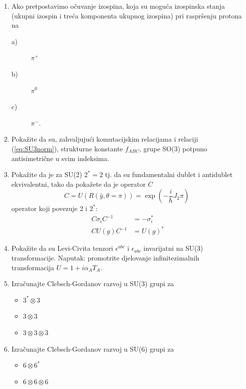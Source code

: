 \begin{enumerate}[label=\arabic{chapter}.\arabic*.]

\item Ako pretpostavimo očuvanje izospina, koja su moguća izospinska
stanja (ukupni izospin i treća komponenta ukupnog izospina) pri
raspršenju protona na

 \begin{description} \item[a)] $\pi^+$
                     \item[b)] $\pi^0$
                     \item[c)] $\pi^-$. \end{description}


\item \label{zad:fabc}
Pokažite da su, zahvaljujući komutacijskim relacijama i relaciji (\ref{eq:SU3norm}),
strukturne konstante $f_{ABC}$, grupe SO(3) potpuno antisimetrične u
svim indeksima.

\item \label{zad:su2dublet}
Pokažite da je za SU(2)  $2^* = 2$ tj. da su fundamentalni dublet i
antidublet ekvivalentni, tako da pokažete da je operator $C$
\begin{displaymath}
  C = U(R(\hat{y},\theta=\pi)) = \exp\left(-\frac{i}{\hbar} J_2 \pi\right) \;
\end{displaymath}
operator koji povezuje 2 i $2^*$:
\begin{align*}
C \sigma_i C^{-1}& = - \sigma_{i}^* \\
C U(g) C^{-1}& = U(g)^*
\end{align*}

\item \label{zad:epsSU3invariance}
Pokažite da su Levi-Civita tenzori $\epsilon^{abc}$ i $\epsilon_{abc}$
invarijatni na SU(3) transformacije. Naputak: promotrite djelovanje
infinitezimalnih transformacija $U=1+i\alpha_A T_A$.

\item \label{zad:3x3x3}
Izračunajte Clebsch-Gordanov razvoj u SU(3) grupi za
\begin{itemize}
\item $3^* \otimes 3$
\item $3 \otimes 3$
\item $3 \otimes 3 \otimes 3$
\end{itemize}

\item Izračunajte Clebsch-Gordanov razvoj u SU(6) grupi za
\begin{itemize}
\item $6 \otimes 6^*$
\item $6 \otimes 6 \otimes 6$
\end{itemize}

\end{enumerate}
